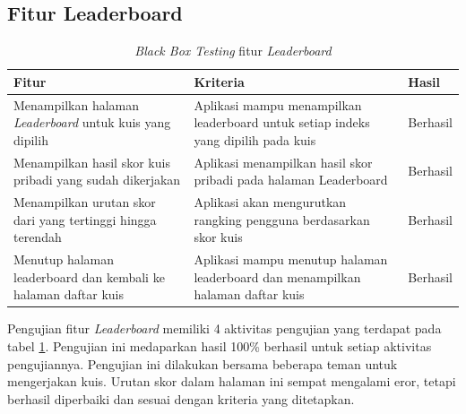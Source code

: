 \subsection{Fitur Leaderboard}
\begin{table}[H]
	\caption{\textit{Black Box Testing} fitur \textit{Leaderboard}}
	\label{Tab:blackBoxLead}
	\begin{tabular}{|p{}|p{}|p{}|}
		\hline
		 \centering\textbf{Fitur} & \multicolumn{1}{m{0.45\textwidth}|}{\centering \textbf{Kriteria}}&  \multicolumn{1}{m{0.1\textwidth}|}{\centering \textbf{Hasil}}\\
		\hline
		Menampilkan halaman \textit{Leaderboard} untuk kuis yang dipilih
		&Aplikasi mampu menampilkan leaderboard untuk setiap indeks yang dipilih pada kuis 
		& Berhasil\\
		\hline
		Menampilkan hasil skor kuis pribadi yang sudah dikerjakan
		& Aplikasi menampilkan hasil skor pribadi pada halaman Leaderboard
		& Berhasil\\
		\hline
		Menampilkan urutan skor dari yang tertinggi hingga terendah
		& Aplikasi akan mengurutkan rangking pengguna berdasarkan skor kuis 
		& Berhasil\\
		\hline
		Menutup halaman leaderboard dan kembali ke halaman daftar kuis
		& Aplikasi mampu menutup halaman leaderboard dan menampilkan halaman daftar kuis
		& Berhasil\\
		\hline
	\end{tabular}
\end{table}
Pengujian fitur \textit{Leaderboard} memiliki 4 aktivitas pengujian yang terdapat pada tabel \ref*{Tab:blackBoxLead}.
Pengujian ini medaparkan hasil 100\% berhasil untuk setiap aktivitas pengujiannya. Pengujian ini dilakukan bersama beberapa teman untuk mengerjakan kuis.
Urutan skor dalam halaman ini sempat mengalami eror, tetapi berhasil diperbaiki dan sesuai dengan kriteria yang ditetapkan.

